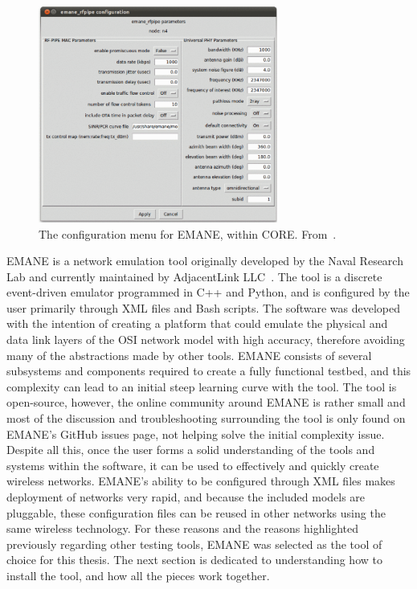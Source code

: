 \begin{figure}[!ht]
    \centering
    \includegraphics[width=0.7\textwidth,keepaspectratio]{Images/Chpt2/core_emane.png}
    \caption{The configuration menu for EMANE, within CORE. From~\cite{emane_core}.}
    \label{core_emane}
\end{figure}

EMANE is a network emulation tool originally developed by the Naval Research Lab and currently maintained by AdjacentLink LLC~\cite{emane_nrl}.
The tool is a discrete event-driven emulator programmed in C++ and Python, and is configured by the user primarily through XML files and Bash scripts.
The software was developed with the intention of creating a platform that could emulate the physical and data link layers of the OSI network model with high accuracy, therefore avoiding many of the abstractions made by other tools.
EMANE consists of several subsystems and components required to create a fully functional testbed, and this complexity can lead to an initial steep learning curve with the tool.
The tool is open-source, however, the online community around EMANE is rather small and most of the discussion and troubleshooting surrounding the tool is only found on EMANE's GitHub issues page, not helping solve the initial complexity issue.
Despite all this, once the user forms a solid understanding of the tools and systems within the software, it can be used to effectively and quickly create wireless networks.
EMANE's ability to be configured through XML files makes deployment of networks very rapid, and because the included models are pluggable, these configuration files can be reused in other networks using the same wireless technology.
For these reasons and the reasons highlighted previously regarding other testing tools, EMANE was selected as the tool of choice for this thesis.
The next section is dedicated to understanding how to install the tool, and how all the pieces work together.\par

